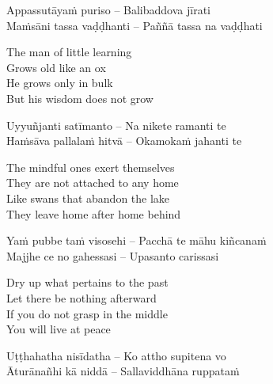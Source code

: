 \suttaRef{[SN 22.43]}

\begin{twochants}
  Appassutāyaṁ puriso – Balibaddova jīrati\\
  Maṁsāni tassa vaḍḍhanti – Paññā tassa na vaḍḍhati\\
\end{twochants}

\begin{english}
  The man of little learning\\
  Grows old like an ox\\
  He grows only in bulk\\
  But his wisdom does not grow
\end{english}

\suttaRef{[Dhp 152]}

\begin{twochants}
  Uyyuñjanti satīmanto – Na nikete ramanti te\\
  Haṁsāva pallalaṁ hitvā – Okamokaṁ jahanti te\\
\end{twochants}

\begin{english}
  The mindful ones exert themselves\\
  They are not attached to any home\\
  Like swans that abandon the lake\\
  They leave home after home behind
\end{english}

\suttaRef{[Dhp 91]}

\begin{twochants}
  Yaṁ pubbe taṁ visosehi – Pacchā te māhu kiñcanaṁ\\
  Majjhe ce no gahessasi – Upasanto carissasi\\
\end{twochants}

\begin{english}
  Dry up what pertains to the past\\
  Let there be nothing afterward\\
  If you do not grasp in the middle\\
  You will live at peace
\end{english}

\suttaRef{[Snp 949]}

\begin{twochants}
  Uṭṭhahatha nisīdatha – Ko attho supitena vo\\
  Āturānañhi kā niddā – Sallaviddhāna ruppataṁ\\
\end{twochants}

